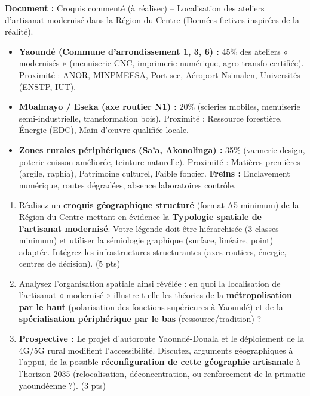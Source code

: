 \documentclass[11pt]{article}
\begin{document}
\begin{exercice}
\textbf{Document :} Croquis commenté (à réaliser) -- Localisation des ateliers d'artisanat modernisé dans la Région du Centre (Données fictives inspirées de la réalité).

\begin{itemize}
    \item \textbf{Yaoundé (Commune d'arrondissement 1, 3, 6) :} 45\% des ateliers « modernisés » (menuiserie CNC, imprimerie numérique, agro-transfo certifiée). Proximité : ANOR, MINPMEESA, Port sec, Aéroport Nsimalen, Universités (ENSTP, IUT).
    \item \textbf{Mbalmayo / Eseka (axe routier N1) :} 20\% (scieries mobiles, menuiserie semi-industrielle, transformation bois). Proximité : Ressource forestière, Énergie (EDC), Main-d'œuvre qualifiée locale.
    \item \textbf{Zones rurales périphériques (Sa'a, Akonolinga) :} 35\% (vannerie design, poterie cuisson améliorée, teinture naturelle). Proximité : Matières premières (argile, raphia), Patrimoine culturel, Faible foncier. \textbf{Freins :} Enclavement numérique, routes dégradées, absence laboratoires contrôle.
\end{itemize}

\begin{enumerate}
    \item Réalisez un \textbf{croquis géographique structuré} (format A5 minimum) de la Région du Centre mettant en évidence la \textbf{ Typologie spatiale de l'artisanat modernisé}. Votre légende doit être hiérarchisée (3 classes minimum) et utiliser la sémiologie graphique (surface, linéaire, point) adaptée. Intégrez les infrastructures structurantes (axes routiers, énergie, centres de décision). (5 pts)
    \item Analysez l'organisation spatiale ainsi révélée : en quoi la localisation de l'artisanat « modernisé » illustre-t-elle les théories de la \textbf{métropolisation par le haut} (polarisation des fonctions supérieures à Yaoundé) et de la \textbf{spécialisation périphérique par le bas} (ressource/tradition) ?
    \item \textbf{Prospective :} Le projet d'autoroute Yaoundé-Douala et le déploiement de la 4G/5G rural modifient l'accessibilité. Discutez, arguments géographiques à l'appui, de la possible \textbf{réconfiguration de cette géographie artisanale} à l'horizon 2035 (relocalisation, déconcentration, ou renforcement de la primatie yaoundéenne ?). (3 pts)
\end{enumerate}
\end{exercice}
\end{document}
